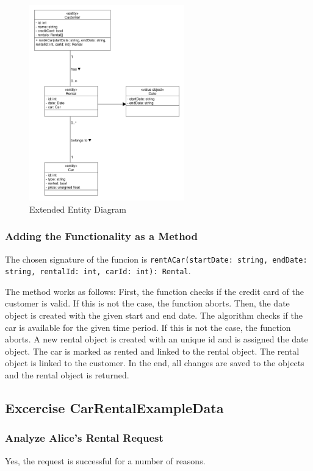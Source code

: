 \begin{figure}[h]
    \centering
    \includegraphics[width=0.6\textwidth]{figures/goLang/carRental/carRental_extendedEntity.png}
    \caption{Extended Entity Diagram}
    \label{fig:extendedEntityDiagram}
\end{figure}

\subsubsection*{Adding the Functionality as a Method}
The chosen signature of the funcion is \texttt{rentACar(startDate: string, endDate: string, rentalId: int, carId: int): Rental}.

The method works as follows:
First, the function checks if the credit card of the customer is valid.
If this is not the case, the function aborts.
Then, the date object is created with the given start and end date.
The algorithm checks if the car is available for the given time period.
If this is not the case, the function aborts.
A new rental object is created with an unique id and is assigned the date object.
The car is marked as rented and linked to the rental object.
The rental object is linked to the customer.
In the end, all changes are saved to the objects and the rental object is returned.

\subsection{Excercise CarRentalExampleData}
\label{sec:exercise_car_rental_example_data}
\subsubsection*{Analyze Alice's Rental Request}
Yes, the request is successful for a number of reasons.

